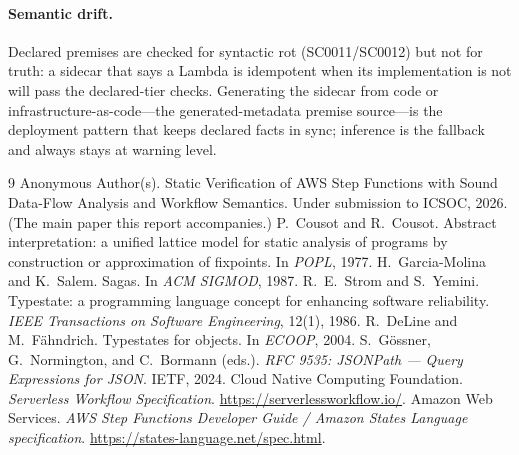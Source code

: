 \documentclass[11pt]{article}
\newcommand{\code}[1]{\textsf{\small #1}}
\theoremstyle{plain}
\theoremstyle{definition}
\theoremstyle{remark}
\begin{document}
\paragraph{Semantic drift.}
Declared premises are checked for syntactic rot (\code{SC0011}/\code{SC0012}) but not for truth:
a sidecar that says a Lambda is idempotent when its implementation is not will pass the
declared-tier checks. Generating the sidecar from code or infrastructure-as-code---the
generated-metadata premise source---is the deployment pattern that keeps declared facts in sync;
inference is the fallback and always stays at warning level.

\begin{thebibliography}{9}
 Anonymous Author(s). Static Verification of AWS Step Functions with Sound
Data-Flow Analysis and Workflow Semantics. Under submission to ICSOC, 2026. (The main paper this
report accompanies.)
 P.~Cousot and R.~Cousot. Abstract interpretation: a unified lattice
model for static analysis of programs by construction or approximation of fixpoints.
In \emph{POPL}, 1977.
 H.~Garcia-Molina and K.~Salem. Sagas.
In \emph{ACM SIGMOD}, 1987.
 R.~E.~Strom and S.~Yemini. Typestate: a programming language concept for
enhancing software reliability. \emph{IEEE Transactions on Software Engineering}, 12(1), 1986.
 R.~DeLine and M.~F\"ahndrich. Typestates for objects.
In \emph{ECOOP}, 2004.
 S.~G\"ossner, G.~Normington, and C.~Bormann (eds.).
\emph{RFC 9535: JSONPath --- Query Expressions for JSON}. IETF, 2024.
 Cloud Native Computing Foundation. \emph{Serverless Workflow Specification}.
\url{https://serverlessworkflow.io/}.
 Amazon Web Services. \emph{AWS Step Functions Developer Guide / Amazon
States Language specification}. \url{https://states-language.net/spec.html}.
\end{thebibliography}
\end{document}
